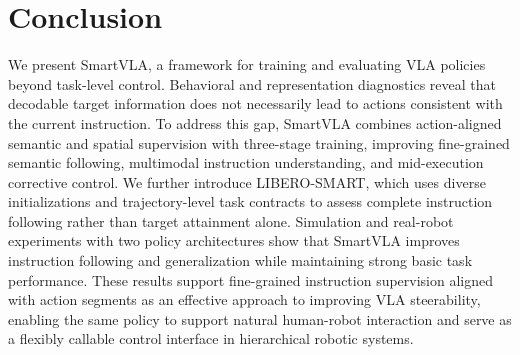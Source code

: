 \hypertarget{conclusion}{%
\section{Conclusion}\label{conclusion}}

We present SmartVLA, a framework for training and evaluating VLA policies
beyond task-level control. Behavioral and representation diagnostics reveal
that decodable target information does not necessarily lead to actions
consistent with the current instruction. To address this gap, SmartVLA
combines action-aligned semantic and spatial supervision with three-stage
training, improving fine-grained semantic following, multimodal instruction
understanding, and mid-execution corrective control. We further introduce LIBERO-SMART, which
uses diverse initializations and trajectory-level task contracts to
assess complete instruction following rather than target attainment
alone. Simulation and real-robot experiments with two policy
architectures show that SmartVLA improves instruction following and
generalization while maintaining strong basic task performance. These
results support fine-grained instruction supervision aligned with action
segments as an effective approach to improving VLA steerability, enabling
the same policy to support natural human-robot interaction and serve as a
flexibly callable control interface in hierarchical robotic systems.

